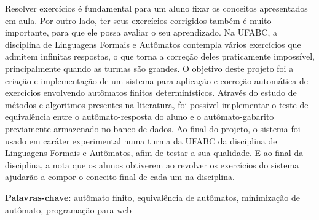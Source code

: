 \documentclass[
	12pt,				%
	openany,
	oneside,
	a4paper,			%
	english,			%
	brazil				%
	]{abntex2}
\begin{document}

\setlength{\absparsep}{18pt} %
\begin{resumo}
  Resolver exercícios é fundamental para um aluno fixar os conceitos apresentados em aula. Por outro lado, ter seus exercícios corrigidos também é muito importante, para que ele possa avaliar o seu aprendizado. Na UFABC, a disciplina de Linguagens Formais e Autômatos contempla vários exercícios que admitem infinitas respostas, o que torna a correção deles praticamente impossível, principalmente quando as turmas são grandes. O objetivo deste projeto foi a criação e implementação de um sistema para aplicação e correção automática de exercícios envolvendo autômatos finitos determinísticos. Através do estudo de métodos e algoritmos presentes na literatura, foi possível implementar o teste de equivalência entre o autômato-resposta do aluno e o autômato-gabarito previamente armazenado no banco de dados. Ao final do projeto, o sistema foi usado em caráter experimental numa turma da UFABC da disciplina de Linguagens Formais e Autômatos, afim de testar a sua qualidade. E ao final da disciplina, a nota que os alunos obtiverem ao revolver os exercícios do sistema ajudarão a compor o conceito final de cada um na disciplina.

 \textbf{Palavras-chave}: autômato finito, equivalência de autômatos, minimização de autômato, programação para web
\end{resumo}

%
%




\end{document}
